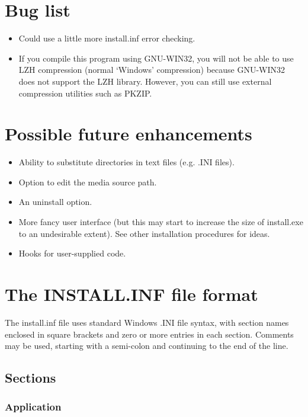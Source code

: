 \chapter{Bug list}

\begin{itemize}
\itemsep=0pt
\item Could use a little more install.inf error checking.
\item If you compile this program using GNU-WIN32, you
will not be able to use LZH compression (normal `Windows' compression) because
GNU-WIN32 does not support the LZH library. However, you can still use
external compression utilities such as PKZIP.
\end{itemize}

\chapter{Possible future enhancements}

\begin{itemize}
\itemsep=0pt
\item Ability to substitute directories in text files (e.g. .INI files).
\item Option to edit the media source path.
\item An uninstall option.
\item More fancy user interface (but this may start to
increase the size of install.exe to an undesirable extent).
See other installation procedures for ideas.
\item Hooks for user-supplied code.
\end{itemize}

\chapter{The INSTALL.INF file format}%
%
\setfooter{\thepage}{}{}{}{}{\thepage}%

The install.inf file uses standard Windows .INI file syntax, with section names
enclosed in square brackets and zero or more entries in each section.
Comments may be used, starting with a semi-colon and continuing to the
end of the line.

\section{Sections}

\subsection{Application}

